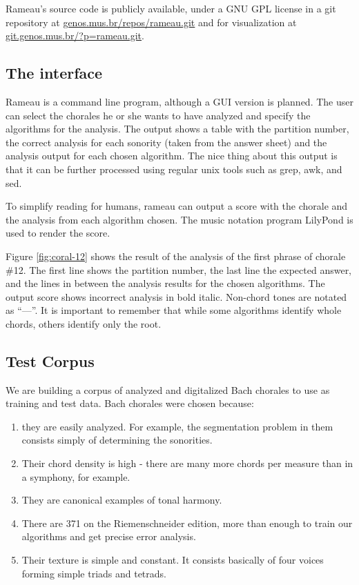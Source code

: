 \documentclass{article}
\begin{document}
Rameau's source code is publicly available, under a GNU GPL
\cite{fsf:gpl} license in a git \cite{baudis:_git_users_manual}
repository at \url{genos.mus.br/repos/rameau.git} and for
visualization at \url{git.genos.mus.br/?p=rameau.git}.

\subsection{The interface}
\label{sec:analysis-output}

Rameau is a command line program, although a GUI version is
planned. The user can select the chorales he or she wants to have
analyzed and specify the algorithms for the analysis. The output shows
a table with the partition number, the correct analysis for each
sonority (taken from the answer sheet) and the analysis output for each
chosen algorithm. The nice thing about this output is that it can be
further processed using regular unix tools such as grep, awk, and sed.

To simplify reading for humans, rameau can output a score with the
chorale and the analysis from each algorithm chosen. The music
notation program LilyPond is used to render the score.

Figure \ref{fig:coral-12} shows the result of the analysis of the
first phrase of chorale \#12. The first line shows the partition
number, the last line the expected answer, and the lines in between
the analysis results for the chosen algorithms. The output score shows
incorrect analysis in bold italic. Non-chord tones are notated as
``—''. It is important to remember that while some algorithms identify
whole chords, others identify only the root.

\subsection{Test Corpus}
\label{sec:test-corpus}

We are building a corpus of analyzed and digitalized Bach chorales to
use as training and test data. Bach chorales were chosen because:

\begin{enumerate}
\item they are easily analyzed. For example, the segmentation problem in
them consists simply of determining the sonorities.
\item Their chord density is high - there are many more chords per
  measure than in a symphony, for example.
\item They are canonical examples of tonal harmony.
\item There are 371 on the Riemenschneider edition, more than
  enough to train our algorithms and get precise error analysis.
\item Their texture is simple and constant. It consists basically of
  four voices forming simple triads and tetrads.
\end{enumerate}
\end{document}
